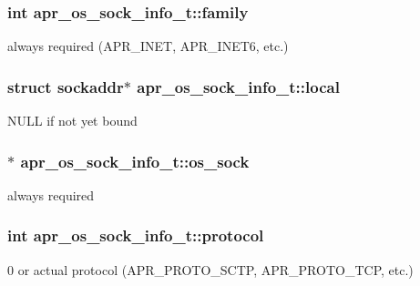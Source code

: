 \subsubsection[{\texorpdfstring{family}{family}}]{\setlength{\rightskip}{0pt plus 5cm}int apr\+\_\+os\+\_\+sock\+\_\+info\+\_\+t\+::family}\hypertarget{structapr__os__sock__info__t_aa29fd0cf57b0b5e3559961f068fa8b7e}{}\label{structapr__os__sock__info__t_aa29fd0cf57b0b5e3559961f068fa8b7e}
always required (A\+P\+R\+\_\+\+I\+N\+ET, A\+P\+R\+\_\+\+I\+N\+E\+T6, etc.) 
\subsubsection[{\texorpdfstring{local}{local}}]{\setlength{\rightskip}{0pt plus 5cm}struct sockaddr$\ast$ apr\+\_\+os\+\_\+sock\+\_\+info\+\_\+t\+::local}\hypertarget{structapr__os__sock__info__t_afaf470560cbc3088479af708878aa086}{}\label{structapr__os__sock__info__t_afaf470560cbc3088479af708878aa086}
N\+U\+LL if not yet bound 
\subsubsection[{\texorpdfstring{os\+\_\+sock}{os_sock}}]{$\ast$ apr\+\_\+os\+\_\+sock\+\_\+info\+\_\+t\+::os\+\_\+sock}\hypertarget{structapr__os__sock__info__t_a952464d2f91ca4650e8b4848a81745b5}{}\label{structapr__os__sock__info__t_a952464d2f91ca4650e8b4848a81745b5}
always required 
\subsubsection[{\texorpdfstring{protocol}{protocol}}]{\setlength{\rightskip}{0pt plus 5cm}int apr\+\_\+os\+\_\+sock\+\_\+info\+\_\+t\+::protocol}\hypertarget{structapr__os__sock__info__t_a176ede3ecf40abf0f82a01bfeb95f1e3}{}\label{structapr__os__sock__info__t_a176ede3ecf40abf0f82a01bfeb95f1e3}
0 or actual protocol (A\+P\+R\+\_\+\+P\+R\+O\+T\+O\+\_\+\+S\+C\+TP, A\+P\+R\+\_\+\+P\+R\+O\+T\+O\+\_\+\+T\+CP, etc.) 
